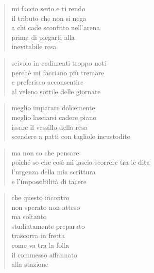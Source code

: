 	\begin{verse}
		mi faccio serio e ti rendo\\
		il tributo che non si nega\\
		a chi cade sconfitto nell'arena\\
		prima di piegarti alla\\
		inevitabile resa
	\end{verse}

\clearpage


	\begin{verse}
		scivolo in cedimenti troppo noti\\
		perché mi facciano più tremare\\
		e preferisco acconsentire\\
		al veleno sottile delle giornate
	\end{verse}

	\begin{verse}
		meglio imparare dolcemente\\
		meglio lasciarsi cadere piano\\
		issare il vessillo della resa\\
		scendere a patti con tagliole incustodite
	\end{verse}

	\begin{verse}
		ma non so che pensare\\
		poiché so che così mi lascio scorrere tra le dita\\
		l'urgenza della mia scrittura\\
		e l'impossibilità di tacere
	\end{verse}

\clearpage


	\begin{verse}
		che questo incontro\\
		non sperato non atteso\\
		ma soltanto\\
		studiatamente preparato\\
		trascorra in fretta\\
		come va tra la folla\\
		il commesso affannato\\
		alla stazione
	\end{verse}

\clearpage


